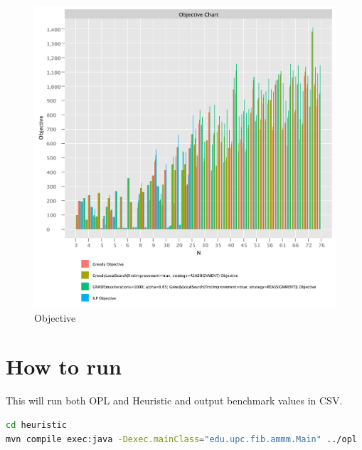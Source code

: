 \documentclass{article}
\begin{document}
\begin{figure}
    \centering
    \includegraphics[width=1\textwidth]{./documentation/assets/all.objectiveChart.pdf}
    \caption{Objective}
    \label{fig:all_time}
\end{figure}\FloatBarrier

\section{How to run}

This will run both OPL and Heuristic and output benchmark values in CSV.

\begin{lstlisting}[language=bash]
cd heuristic
mvn compile exec:java -Dexec.mainClass="edu.upc.fib.ammm.Main" ../opl
\end{lstlisting}
\end{document}

